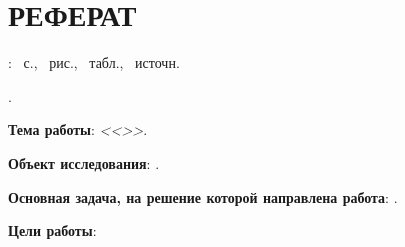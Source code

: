 \chapter*{РЕФЕРАТ}
\doctype\xspace: ~с., ~рис., ~табл., ~источн.%

\vspace{3mm}

\MakeUppercase{\keywordsru}.

\Preface


\textbf{Тема работы}: \textit{<<\Title>>}.

\textbf{Объект исследования}: \ObjectOfResearch.

\textbf{Основная задача, на решение которой направлена работа}: \MainProblemOfResearch.

\textbf{Цели работы}: \GoalOfResearch

\SubtasksPerformed


